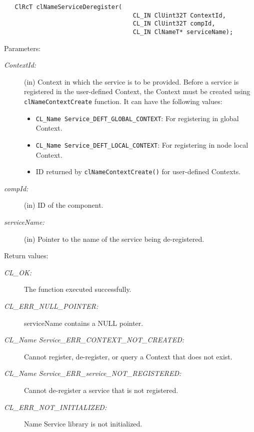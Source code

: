 \begin{flushleft}
\begin{Desc}
\footnotesize\begin{verbatim}   ClRcT clNameServiceDeregister(
                        			CL_IN ClUint32T ContextId,
                        			CL_IN ClUint32T compId,
                        			CL_IN ClNameT* serviceName);
\end{verbatim}
\normalsize
\end{Desc}
\begin{Desc}
\item[Parameters:]
\begin{description}
\item[{\em Context\-Id:}](in) Context in which the service is to be provided. Before a service is registered in the user-defined Context, the Context must be created      
using {\tt{clNameContextCreate}} function. It can have the following values: \begin{itemize}
\item
 {\tt{CL\_\-Name Service\_\-DEFT\_\-GLOBAL\_\-CONTEXT}}: For registering in global Context. 
\item
{\tt{CL\_\-Name Service\_\-DEFT\_\-LOCAL\_\-CONTEXT}}: For registering in node local Context. 
 \item
 ID returned by {\tt{clNameContextCreate()}} for user-defined Contexts.
\end{itemize}
\item[{\em comp\-Id:}](in) ID of the component. 
\item[{\em service\-Name:}](in) Pointer to the name of the service being de-registered.\end{description}
\end{Desc}
\begin{Desc}
\item[Return values:]
\begin{description}
\item[{\em CL\_\-OK:}]The function executed successfully. 
\item[{\em CL\_\-ERR\_\-NULL\_\-POINTER:}]serviceName contains a NULL pointer.
\item[{\em CL\_\-Name Service\_\-ERR\_\-CONTEXT\_\-NOT\_\-CREATED:}]Cannot register, de-register, or query
a Context that does not exist. 
\item[{\em CL\_\-Name Service\_\-ERR\_\-service\_\-NOT\_\-REGISTERED:}]Cannot de-register a service that is not registered. 
\item[{\em CL\_\-ERR\_\-NOT\_\-INITIALIZED:}]Name Service library is not initialized.\end{description}
\end{Desc}

\end{flushleft}
